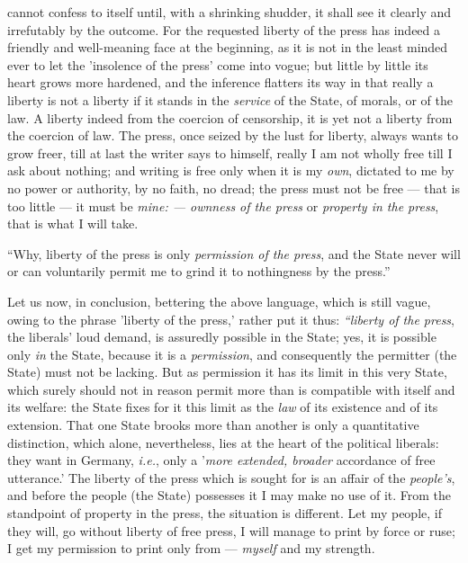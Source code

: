 cannot confess to itself until, with a shrinking shudder, it shall see it 
clearly and irrefutably by the outcome. For the requested liberty of the press 
has indeed a friendly and well-meaning face at the beginning, as it is not in 
the least minded ever to let the 'insolence of the press' come into vogue; but 
little by little its heart grows more hardened, and the inference flatters its 
way in that really a liberty is not a liberty if it stands in the 
\textit{service} of the State, of morals, or of the law. A liberty indeed from 
the coercion of censorship, it is yet not a liberty from the coercion of law. 
The press, once seized by the lust for liberty, always wants to grow freer, 
till at last the writer says to himself, really I am not wholly free till I 
ask about nothing; and writing is free only when it is my \textit{own}, 
dictated to me by no power or authority, by no faith, no dread; the press must 
not be free --- that is too little --- it must be \textit{mine: --- ownness of 
the press} or \textit{property in the press}, that is what I will take.

``Why, liberty of the press is only \textit{permission of the press}, and the 
State never will or can voluntarily permit me to grind it to nothingness by 
the press.''

Let us now, in conclusion, bettering the above language, which is still vague, 
owing to the phrase 'liberty of the press,' rather put it thus: 
\textit{``liberty of the press}, the liberals' loud demand, is assuredly 
possible in the State; yes, it is possible only \textit{in} the State, because 
it is a \textit{permission}, and consequently the permitter (the State) must 
not be lacking. But as permission it has its limit in this very State, which 
surely should not in reason permit more than is compatible with itself and its 
welfare: the State fixes for it this limit as the \textit{law} of its 
existence and of its extension. That one State brooks more than another is 
only a quantitative distinction, which alone, nevertheless, lies at the heart 
of the political liberals: they want in Germany, \textit{i.e.}, only a 
'\textit{more extended, broader} accordance of free utterance.' The liberty of 
the press which is sought for is an affair of the \textit{people's}, and 
before the people (the State) possesses it I may make no use of it. From the 
standpoint of property in the press, the situation is different. Let my 
people, if they will, go without liberty of free press, I will manage to print 
by force or ruse; I get my permission to print only from --- \textit{myself} 
and my strength.

